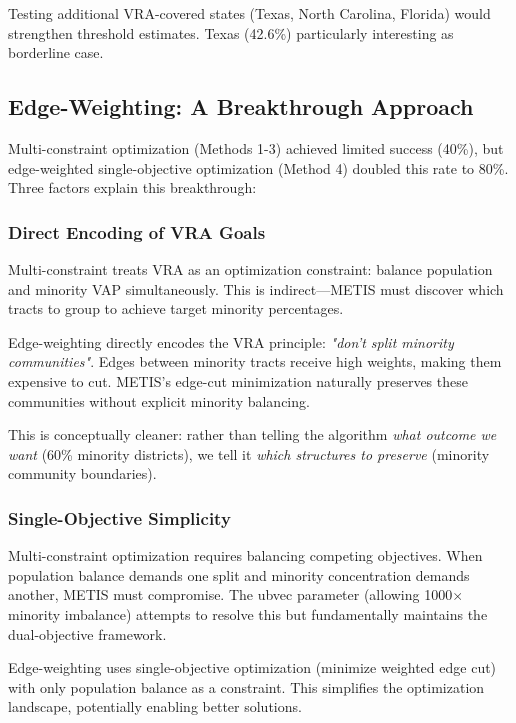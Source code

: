 Testing additional VRA-covered states (Texas, North Carolina, Florida) would strengthen threshold estimates. Texas (42.6\%) particularly interesting as borderline case.

\subsection{Edge-Weighting: A Breakthrough Approach}

Multi-constraint optimization (Methods 1-3) achieved limited success (40\%), but edge-weighted single-objective optimization (Method 4) doubled this rate to 80\%. Three factors explain this breakthrough:

\subsubsection{Direct Encoding of VRA Goals}

Multi-constraint treats VRA as an optimization constraint: balance population and minority VAP simultaneously. This is indirect—METIS must discover which tracts to group to achieve target minority percentages.

Edge-weighting directly encodes the VRA principle: \textit{"don't split minority communities"}. Edges between minority tracts receive high weights, making them expensive to cut. METIS's edge-cut minimization naturally preserves these communities without explicit minority balancing.

This is conceptually cleaner: rather than telling the algorithm \textit{what outcome we want} (60\% minority districts), we tell it \textit{which structures to preserve} (minority community boundaries).

\subsubsection{Single-Objective Simplicity}

Multi-constraint optimization requires balancing competing objectives. When population balance demands one split and minority concentration demands another, METIS must compromise. The ubvec parameter (allowing 1000$\times$ minority imbalance) attempts to resolve this but fundamentally maintains the dual-objective framework.

Edge-weighting uses single-objective optimization (minimize weighted edge cut) with only population balance as a constraint. This simplifies the optimization landscape, potentially enabling better solutions.

